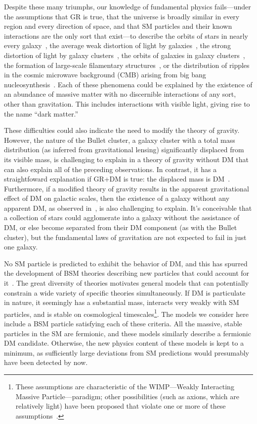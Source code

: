 Despite these many triumphs, our knowledge of fundamental physics fails---under the assumptions that GR is true, that the universe is broadly similar in every region and every
direction of space, and that SM particles and their known interactions are the only sort that exist---to describe the orbits of stars in nearly every galaxy~\cite{ref:nature25767},
the average weak distortion of light by galaxies~\cite{ref:weaklensing}, the strong distortion of light by galaxy clusters~\cite{ref:mnras/stw3385}, the orbits of galaxies in galaxy clusters~\cite{ref:annurev-astro-081710-102514},
the formation of large-scale filamentary structures~\cite{ref:nature03597}, or the distribution of ripples in the cosmic microwave background (CMB) arising from big bang nucleosynthesis~\cite{ref:planck2018_cosparams}.
Each of these phenomena could be explained by the existence of an abundance of massive matter with no discernible interactions of any sort, other than gravitation.
This includes interactions with visible light, giving rise to the name ``dark matter.''

These difficulties could also indicate the need to modify the theory of gravity.
However, the nature of the Bullet cluster, a galaxy cluster with a total mass distribution (as inferred from gravitational lensing) significantly displaced from its visible mass,
is challenging to explain in a theory of gravity without DM that can also explain all of the preceding observations.
In contrast, it has a straightfoward explanation if GR+DM is true: the displaced mass is DM~\cite{ref:508162}. Furthermore, if a modified theory of gravity
results in the apparent gravitational effect of DM on galactic scales, then the existence of a galaxy without any apparent DM, as observed in~\cite{ref:nature25767}, is
also challenging to explain. It's conceivable that a collection of stars could agglomerate into a galaxy without the assistance of DM, or else become separated from their
DM component (as with the Bullet cluster), but the fundamental laws of gravitation are not expected to fail in just one galaxy.

No SM particle is predicted to exhibit the behavior of DM, and this has spurred the development
of BSM theories describing new particles that could account for it~\cite{ref:s41550-017-0059, ref:j.physrep.2004.08.031, ref:annurev.nucl.54.070103.181244, ref:S1062798717000783}.
The great diversity of theories motivates general models that can potentially constrain a wide variety of specific theories simultaneously.
If DM is particulate in nature, it seemingly has a substantial mass, interacts very weakly with SM particles, and is stable on cosmological timescales\footnote{These assumptions
are characteristic of the WIMP---Weakly Interacting Massive Particle---paradigm; other possibilities (such as axions, which are relatively light) have been proposed
that violate one or more of these assumptions~\cite{ref:S1062798717000783}.}.
The models we consider here include a BSM particle satisfying each of these criteria.
All the massive, stable particles in the SM are fermionic, and these models similarly describe a fermionic DM candidate. Otherwise, the new physics
content of these models is kept to a minimum, as sufficiently large deviations from SM predictions would presumably have been detected by now.

